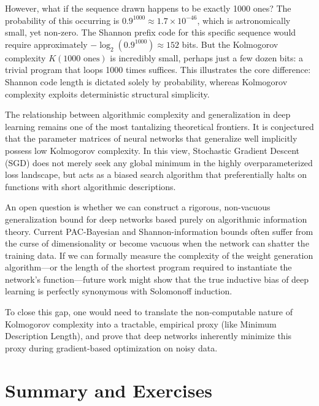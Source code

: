 However, what if the sequence drawn happens to be exactly 1000 ones? The probability of this occurring is $0.9^{1000} \approx 1.7 \times 10^{-46}$, which is astronomically small, yet non-zero. The Shannon prefix code for this specific sequence would require approximately $-\log_2(0.9^{1000}) \approx 152$ bits. But the Kolmogorov complexity $K(\text{1000 ones})$ is incredibly small, perhaps just a few dozen bits: a trivial program that loops 1000 times suffices. This illustrates the core difference: Shannon code length is dictated solely by probability, whereas Kolmogorov complexity exploits deterministic structural simplicity.

\begin{horizon}
The relationship between algorithmic complexity and generalization in deep learning remains one of the most tantalizing theoretical frontiers. It is conjectured that the parameter matrices of neural networks that generalize well implicitly possess low Kolmogorov complexity. In this view, Stochastic Gradient Descent (SGD) does not merely seek any global minimum in the highly overparameterized loss landscape, but acts as a biased search algorithm that preferentially halts on functions with short algorithmic descriptions.

An open question is whether we can construct a rigorous, non-vacuous generalization bound for deep networks based purely on algorithmic information theory. Current PAC-Bayesian and Shannon-information bounds often suffer from the curse of dimensionality or become vacuous when the network can shatter the training data. If we can formally measure the complexity of the weight generation algorithm---or the length of the shortest program required to instantiate the network's function---future work might show that the true inductive bias of deep learning is perfectly synonymous with Solomonoff induction. 

To close this gap, one would need to translate the non-computable nature of Kolmogorov complexity into a tractable, empirical proxy (like Minimum Description Length), and prove that deep networks inherently minimize this proxy during gradient-based optimization on noisy data.
\end{horizon}

\section{Summary and Exercises}

